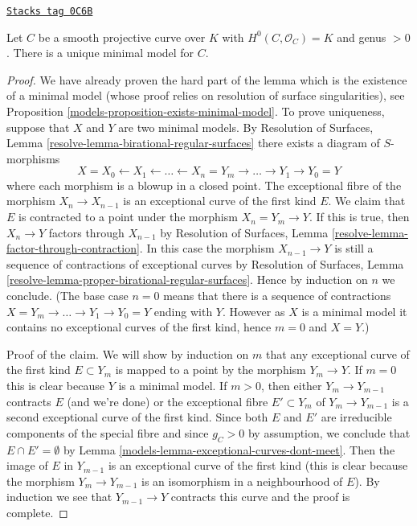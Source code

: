 \begin{lemma}
\label{models-lemma-minimal-model-unique}
\href{https://stacks.math.columbia.edu/tag/0C6B}{\texttt{Stacks tag 0C6B}}

Let $C$ be a smooth projective curve over $K$ with
$H^0(C, \mathcal{O}_C) = K$ and genus $> 0$.
There is a unique minimal model for $C$.
\end{lemma}

\begin{proof}

We have already proven the hard part of the lemma which is the existence
of a minimal model (whose proof relies on
resolution of surface singularities), see
Proposition \ref{models-proposition-exists-minimal-model}.
To prove uniqueness, suppose that $X$ and $Y$ are two
minimal models. By
Resolution of Surfaces, Lemma \ref{resolve-lemma-birational-regular-surfaces}
there exists a diagram of $S$-morphisms
$$
X = X_0 \leftarrow X_1 \leftarrow \ldots \leftarrow X_n = Y_m
\to \ldots \to Y_1 \to Y_0 = Y
$$
where each morphism is a blowup in a closed point. The
exceptional fibre of the morphism $X_n \to X_{n - 1}$ is an
exceptional curve of the first kind $E$. We claim that $E$ is
contracted to a point under the morphism $X_n = Y_m \to Y$.
If this is true, then $X_n \to Y$ factors through $X_{n - 1}$ by
Resolution of Surfaces, Lemma \ref{resolve-lemma-factor-through-contraction}.
In this case the morphism $X_{n - 1} \to Y$ is still a sequence of
contractions of exceptional curves by
Resolution of Surfaces, Lemma
\ref{resolve-lemma-proper-birational-regular-surfaces}.
Hence by induction on $n$ we conclude. (The base case $n = 0$ means
that there is a sequence of contractions
$X = Y_m \to \ldots \to Y_1 \to Y_0 = Y$
ending with $Y$. However as $X$ is a minimal model it contains
no exceptional curves of the first kind, hence $m = 0$ and $X = Y$.)

\medskip\noindent
Proof of the claim. We will show by induction on $m$ that any exceptional
curve of the first kind $E \subset Y_m$ is mapped to a point
by the morphism $Y_m \to Y$. If $m = 0$ this is clear because
$Y$ is a minimal model. If $m > 0$, then either
$Y_m \to Y_{m - 1}$ contracts $E$ (and we're done) or
the exceptional fibre $E' \subset Y_m$ of $Y_m \to Y_{m - 1}$
is a second exceptional curve of the first kind.
Since both $E$ and $E'$ are irreducible components of the special
fibre and since $g_C > 0$ by assumption, we conclude that
$E \cap E' = \emptyset$ by
Lemma \ref{models-lemma-exceptional-curves-dont-meet}.
Then the image of $E$ in $Y_{m - 1}$ is an exceptional
curve of the first kind (this is clear because the morphism
$Y_m \to Y_{m - 1}$ is an isomorphism in a neighbourhood of $E$).
By induction we see that $Y_{m - 1} \to Y$ contracts this curve
and the proof is complete.
\end{proof}

